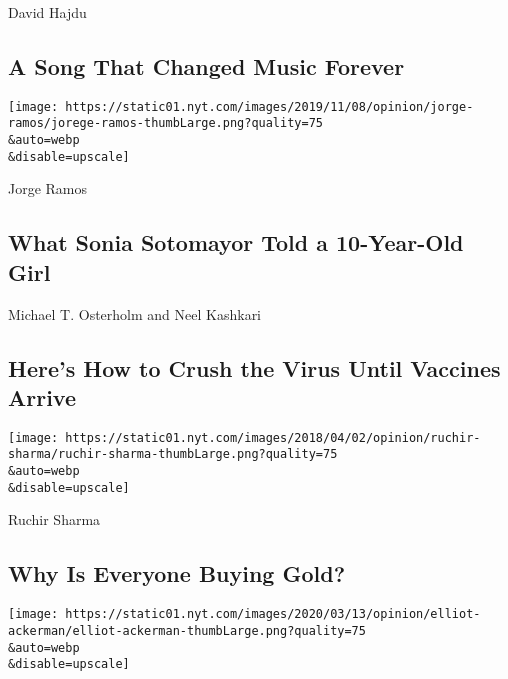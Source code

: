 David Hajdu

\hypertarget{a-song-that-changed-music-forever}{%
\subsection{A Song That Changed Music
Forever}\label{a-song-that-changed-music-forever}}

\href{/2020/08/07/opinion/latina-women-politics.html}{}

\texttt{[image: https://static01.nyt.com/images/2019/11/08/opinion/jorge-ramos/jorege-ramos-thumbLarge.png?quality=75\\\&auto=webp\\\&disable=upscale]}

Jorge Ramos

\hypertarget{what-sonia-sotomayor-told-a-10-year-old-girl}{%
\subsection{What Sonia Sotomayor Told a 10-Year-Old
Girl}\label{what-sonia-sotomayor-told-a-10-year-old-girl}}

\href{/2020/08/07/opinion/coronavirus-lockdown-unemployment-death.html}{}

Michael T. Osterholm and Neel Kashkari

\hypertarget{heres-how-to-crush-the-virus-until-vaccines-arrive}{%
\subsection{Here's How to Crush the Virus Until Vaccines
Arrive}\label{heres-how-to-crush-the-virus-until-vaccines-arrive}}

\href{/2020/08/08/opinion/gold-investment-coronavirus.html}{}

\texttt{[image: https://static01.nyt.com/images/2018/04/02/opinion/ruchir-sharma/ruchir-sharma-thumbLarge.png?quality=75\\\&auto=webp\\\&disable=upscale]}

Ruchir Sharma

\hypertarget{why-is-everyone-buying-gold}{%
\subsection{Why Is Everyone Buying
Gold?}\label{why-is-everyone-buying-gold}}

\href{/2020/08/08/opinion/nazi-confederate-military-history-ksk.html}{}

\texttt{[image: https://static01.nyt.com/images/2020/03/13/opinion/elliot-ackerman/elliot-ackerman-thumbLarge.png?quality=75\\\&auto=webp\\\&disable=upscale]}

